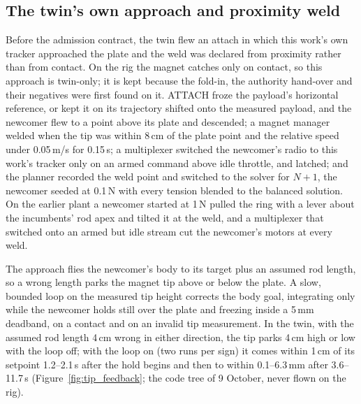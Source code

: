 \subsection{The twin's own approach and proximity weld}
\label{sec:app_proximity_weld}

Before the admission contract, the twin flew an attach in which this work's own tracker approached the plate and the
weld was declared from proximity rather than from contact. On the rig the magnet catches only on contact, so this
approach is twin-only; it is kept because the fold-in, the authority hand-over and their negatives were first found on
it. ATTACH froze the payload's horizontal reference, or kept it on its trajectory shifted onto the measured payload,
and the newcomer flew to a point above its plate and descended; a magnet manager welded when the tip was within 8\,cm
of the plate point and the relative speed under 0.05\,m/s for 0.15\,s; a multiplexer switched the newcomer's radio to
this work's tracker only on an armed command above idle throttle, and latched; and the planner recorded the weld point
and switched to the solver for $N+1$, the newcomer seeded at 0.1\,N with every tension blended to the balanced
solution. On the earlier plant a newcomer started at 1\,N pulled the ring with a lever about the incumbents' rod apex
and tilted it at the weld, and a multiplexer that switched onto an armed but idle stream cut the newcomer's motors at
every weld.

The approach flies the newcomer's body to its target plus an assumed rod length, so a wrong length parks the magnet
tip above or below the plate. A slow, bounded loop on the measured tip height corrects the body goal, integrating only
while the newcomer holds still over the plate and freezing inside a 5\,mm deadband, on a contact and on an invalid tip
measurement. In the twin, with the assumed rod length 4\,cm wrong in either direction, the tip parks 4\,cm high or low
with the loop off; with the loop on (two runs per sign) it comes within 1\,cm of its setpoint 1.2--2.1\,s after the
hold begins and then to within 0.1--6.3\,mm after 3.6--11.7\,s (Figure~\ref{fig:tip_feedback}; the code tree of 9
October, never flown on the rig).

